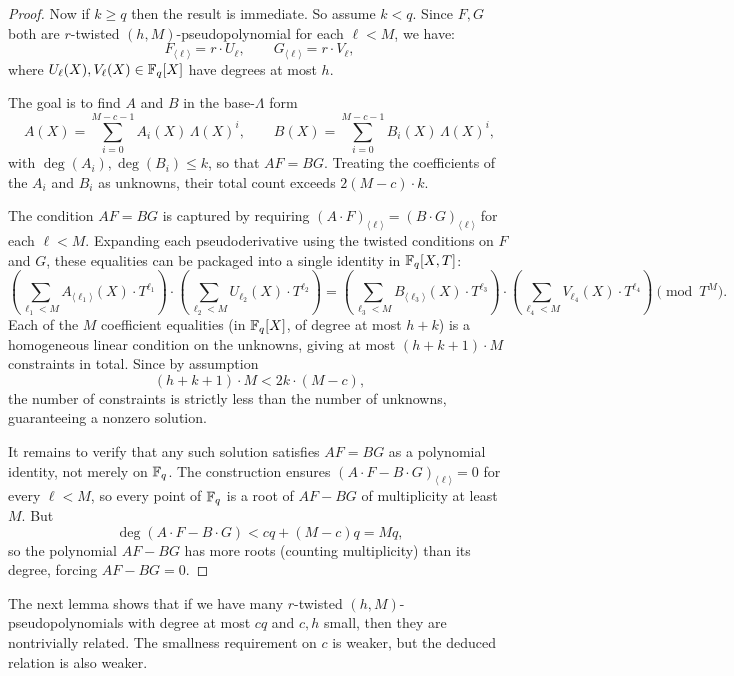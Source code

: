 \begin{proof}
  Now if $k\geq q$ then the result is immediate. So assume $k<q$. Since $F,G$ both are $r$-twisted $(h,M)$-pseudopolynomial for each $\ell < M$, we have:
  \[
    F_{\langle\ell\rangle} = r \cdot U_\ell, \qquad G_{\langle\ell\rangle} = r \cdot V_\ell,
  \]
  where $U_\ell(X), V_\ell(X) \in \mathbb{F}_q[X]$ have degrees at most $h$.

  The goal is to find $A$ and $B$ in the base-$\Lambda$ form
  \[
    A(X) = \sum_{i=0}^{M-c-1} A_i(X)\,\Lambda(X)^i, \qquad
    B(X) = \sum_{i=0}^{M-c-1} B_i(X)\,\Lambda(X)^i,
  \]
  with $\deg(A_i), \deg(B_i) \leq k$, so that $AF = BG$. Treating the coefficients of the $A_i$ and $B_i$ as unknowns, their total count exceeds $2(M-c)\cdot k$.

  The condition $AF = BG$ is captured by requiring $(A \cdot F)_{\langle\ell\rangle} = (B \cdot G)_{\langle\ell\rangle}$ for each $\ell < M$. Expanding each pseudoderivative using the twisted conditions on $F$ and $G$, these equalities can be packaged into a single identity in $\mathbb{F}_q[X, T]$:
  \[
    \left(\sum_{\ell_1 < M} A_{\langle\ell_1\rangle}(X)\cdot T^{\ell_1}\right)
    \cdot
    \left(\sum_{\ell_2 < M} U_{\ell_2}(X)\cdot T^{\ell_2}\right)
    =
    \left(\sum_{\ell_3 < M} B_{\langle\ell_3\rangle}(X)\cdot T^{\ell_3}\right)
    \cdot
    \left(\sum_{\ell_4 < M} V_{\ell_4}(X)\cdot T^{\ell_4}\right)
    \pmod{T^M}.
  \]
  Each of the $M$ coefficient equalities (in $\mathbb{F}_q[X]$, of degree at most $h + k$) is a homogeneous linear condition on the unknowns, giving at most $(h + k + 1)\cdot M$ constraints in total. Since by assumption
  \[
    (h + k + 1)\cdot M < 2k\cdot(M - c),
  \]
  the number of constraints is strictly less than the number of unknowns, guaranteeing a nonzero solution.

  It remains to verify that any such solution satisfies $AF = BG$ as a polynomial identity, not merely on $\mathbb{F}_q$. The construction ensures $(A \cdot F - B \cdot G)_{\langle\ell\rangle} = 0$ for every $\ell < M$, so every point of $\mathbb{F}_q$ is a root of $AF - BG$ of multiplicity at least $M$. But
  \[
    \deg(A \cdot F - B \cdot G) < cq + (M - c)q = Mq,
  \]
  so the polynomial $AF - BG$ has more roots (counting multiplicity) than its degree, forcing $AF - BG = 0$.
\end{proof}

The next lemma shows that if we have many $r$-twisted $(h, M)$-pseudopolynomials with degree at most $cq$ and $c, h$ small, then they are nontrivially related. The smallness requirement on $c$ is weaker, but the deduced relation is also weaker.

